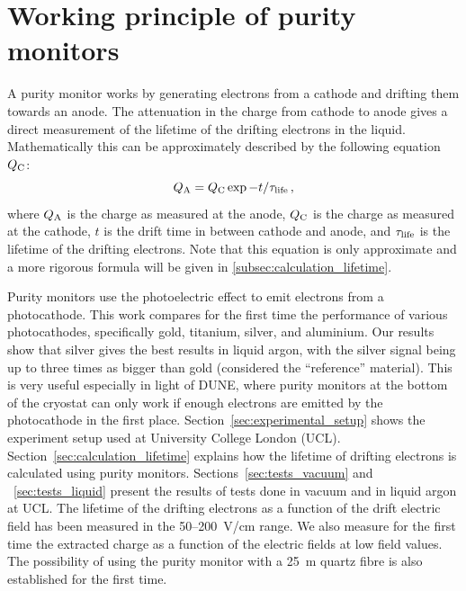 \documentclass[a4paper,11pt]{article}
\newcommand{\QC}{\ensuremath{Q_{\rm C}}\xspace}
\newcommand{\QA}{\ensuremath{Q_{\rm A}}\xspace}
\newcommand{\taulife}{\ensuremath{\tau_{\rm life}}\xspace}
\begin{document}
\section{Working principle of purity monitors}
\label{sec:purity_monitors}
A purity monitor works by generating electrons from a cathode and drifting them towards an anode. 
The attenuation in the charge from cathode to anode gives a direct measurement of the lifetime of the drifting electrons in the liquid.
Mathematically this can be approximately described by the following equation \QC :
\begin{equation}
    \QA = \QC \exp{-t/\taulife} \,,
\end{equation}
\noindent where \QA is the charge as measured at the anode, \QC is the charge as measured at the cathode, $t$ is the drift time in between cathode and anode, and \taulife is the lifetime of the drifting electrons. Note that this equation is only approximate and a more rigorous formula will be given in \ref{subsec:calculation_lifetime}.

Purity monitors use the photoelectric effect to emit electrons from a photocathode. This work compares for the first time the performance of various photocathodes, specifically gold, titanium, silver, and aluminium. Our results show that silver gives the best results in liquid argon, with the silver signal being up to three times as bigger than gold (considered the ``reference'' material). This is very useful especially in light of DUNE, where purity monitors at the bottom of the cryostat can only work if enough electrons are emitted by the photocathode in the first place. 
Section~\ref{sec:experimental_setup} shows the experiment setup used at University College London (UCL). 
Section~\ref{sec:calculation_lifetime} explains how the lifetime of drifting electrons is calculated using purity monitors.
Sections~\ref{sec:tests_vacuum} and ~\ref{sec:tests_liquid} present the results of tests done in vacuum and in liquid argon at UCL. The lifetime of the drifting electrons as a function of the drift electric field has been measured in the 50--\SI{200}{V/cm} range. %
We also measure for the first time the extracted charge as a function of the electric fields at low field values. 
The possibility of using the purity monitor with a \SI{25}{m} quartz fibre is also established for the first time.  
\end{document}
